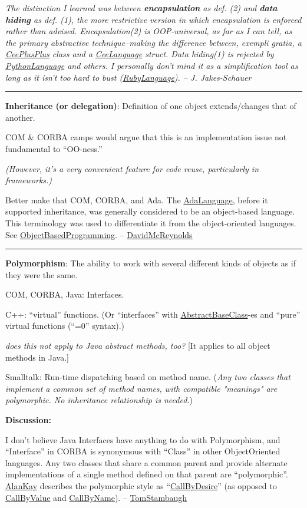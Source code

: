 \documentclass[10pt,twoside,openright]{memoir}
\begin{document}
\emph{The distinction I learned was between \textbf{encapsulation} as def. (2) and \textbf{data hiding} as def. (1), the more restrictive version in which encapsulation is enforced rather than advised. Encapsulation(2) is OOP-universal, as far as I can tell, as the primary abstractive technique--making the difference between, exempli gratia, a \ul{CeePlusPlus} class and a \ul{CeeLanguage} struct. Data hiding(1) is rejected by \ul{PythonLanguage} and others. I personally don't mind it as a simplification tool as long as it isn't too hard to bust (\ul{RubyLanguage}). -- J. Jakes-Schauer}

\vskip 0.1in
\hrule
\vskip 0.1in

\textbf{Inheritance (or delegation)}: Definition of one object extends/changes that of another.

COM \& CORBA camps would argue that this is an implementation issue not fundamental to ``OO-ness.''

\emph{(However, it's a very convenient feature for code reuse, particularly in frameworks.)}

Better make that COM, CORBA, and Ada. The \ul{AdaLanguage}, before it supported inheritance, was generally considered to be an object-based language. This terminology was used to differentiate it from the object-oriented languages. See \ul{ObjectBasedProgramming}. -- \ul{DavidMcReynolds}

\vskip 0.1in
\hrule
\vskip 0.1in

\textbf{Polymorphism}: The ability to work with several different kinds of objects as if they were the same.

COM, CORBA, Java: Interfaces.

C++: ``virtual'' functions. (Or ``interfaces'' with \ul{AbstractBaseClass}-es and ``pure'' virtual functions (``=0'' syntax).)

\emph{does this not apply to Java abstract methods, too?} [It applies to all object methods in Java.]

Smalltalk: Run-time dispatching based on method name. (\emph{Any two classes that implement a common set of method names, with compatible "meanings" are polymorphic. No inheritance relationship is needed.})

\textbf{Discussion:}

I don't believe Java Interfaces have anything to do with Polymorphism, and ``Interface'' in CORBA is synonymous with ``Class'' in other ObjectOriented languages. Any two classes that share a common parent and provide alternate implementations of a single method defined on that parent are ``polymorphic''. \ul{AlanKay} describes the polymorphic style as ``\ul{CallByDesire}'' (as opposed to \ul{CallByValue} and \ul{CallByName}). -- \ul{TomStambaugh}
\end{document}

